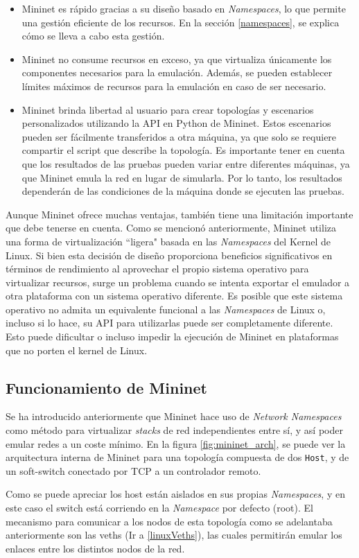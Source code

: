 \begin{itemize}
    \item Mininet es rápido gracias a su diseño basado en \textit{Namespaces}, lo que permite una gestión eficiente de los recursos. En la sección \ref{namespaces}, se explica cómo se lleva a cabo esta gestión.
    \item Mininet no consume recursos en exceso, ya que virtualiza únicamente los componentes necesarios para la emulación. Además, se pueden establecer límites máximos de recursos para la emulación en caso de ser necesario.
    \item Mininet brinda libertad al usuario para crear topologías y escenarios personalizados utilizando la API en Python de Mininet. Estos escenarios pueden ser fácilmente transferidos a otra máquina, ya que solo se requiere compartir el script que describe la topología. Es importante tener en cuenta que los resultados de las pruebas pueden variar entre diferentes máquinas, ya que Mininet emula la red en lugar de simularla. Por lo tanto, los resultados dependerán de las condiciones de la máquina donde se ejecuten las pruebas.
\end{itemize}

Aunque Mininet ofrece muchas ventajas, también tiene una limitación importante que debe tenerse en cuenta. Como se mencionó anteriormente, Mininet utiliza una forma de virtualización ``ligera" basada en las \textit{Namespaces} del Kernel de Linux. Si bien esta decisión de diseño proporciona beneficios significativos en términos de rendimiento al aprovechar el propio sistema operativo para virtualizar recursos, surge un problema cuando se intenta exportar el emulador a otra plataforma con un sistema operativo diferente. Es posible que este sistema operativo no admita un equivalente funcional a las \textit{Namespaces} de Linux o, incluso si lo hace, su API para utilizarlas puede ser completamente diferente. Esto puede dificultar o incluso impedir la ejecución de Mininet en plataformas que no porten el kernel de Linux.


\subsection{Funcionamiento de Mininet}

Se ha introducido anteriormente que Mininet hace uso de \textit{Network Namespaces} como método para virtualizar \textit{stacks} de red independientes entre sí, y así poder emular redes a un coste mínimo. En la figura \ref{fig:mininet_arch}, se puede ver la arquitectura interna de Mininet para una topología compuesta de dos \texttt{Host}, y de un soft-switch conectado por TCP a un controlador remoto.\\
\par
Como se puede apreciar los host están aislados en sus propias \textit{Namespaces}, y en este caso el switch está corriendo en la \textit{Namespace} por defecto (root). El mecanismo para comunicar a los nodos de esta topología como se adelantaba anteriormente son las \gls{veth}s (Ir a \ref{linuxVeths}), las cuales permitirán emular los enlaces entre los distintos nodos de la red.\\


